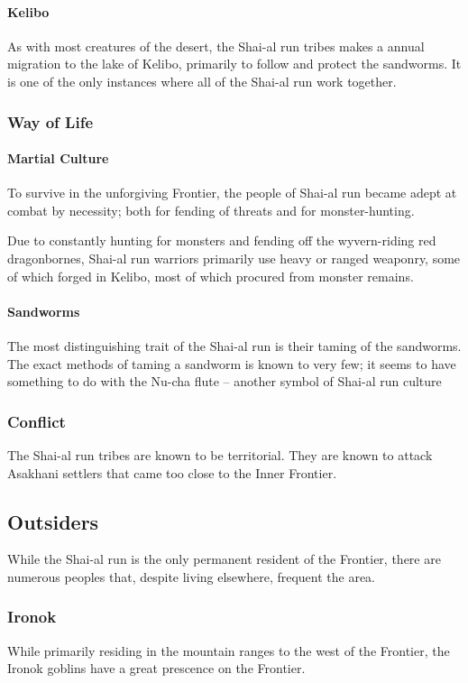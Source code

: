 \documentclass[../main.tex]{subfiles}
\begin{document}
\paragraph{Kelibo}
As with most creatures of the desert, the Shai-al run tribes makes a
annual migration to the lake of Kelibo, primarily to follow and protect the
sandworms. It is one of the only instances where all of the Shai-al run
work together.

\subsubsection{Way of Life}
\paragraph{Martial Culture}
To survive in the unforgiving Frontier, the people of Shai-al run
became adept at combat by necessity; both for fending of threats and
for monster-hunting.

Due to constantly hunting for monsters and fending off the wyvern-riding red
dragonbornes, Shai-al run warriors primarily use heavy or ranged weaponry,
some of which forged in Kelibo, most of which procured from monster remains.
\paragraph{Sandworms}
The most distinguishing trait of the Shai-al run is their taming
of the sandworms. The exact methods of taming a sandworm is known to very few;
it seems to have something to do with the Nu-cha flute -- another
symbol of Shai-al run culture

\subsubsection{Conflict}
The Shai-al run tribes are known to be territorial. They are known to attack
Asakhani settlers that came too close to the Inner Frontier.

\subsection{Outsiders}
While the Shai-al run is the only permanent resident of the Frontier,
there are numerous peoples that, despite living elsewhere, frequent the area.

\subsubsection{Ironok}
While primarily residing in the mountain ranges to the west of the Frontier,
the Ironok goblins have a great prescence on the Frontier.
\end{document}
